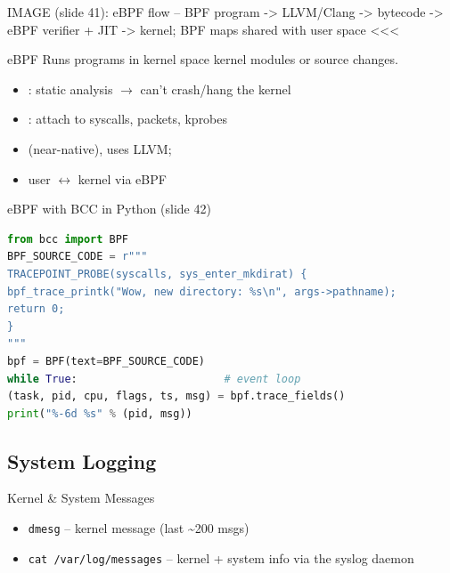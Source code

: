 IMAGE (slide 41): eBPF flow -- BPF program -> LLVM/Clang -> bytecode -> eBPF verifier + JIT -> kernel; BPF maps shared with user space <<<

\begin{concept}{eBPF}
    Runs  programs in kernel space  kernel
    modules or source changes.
    \begin{itemize}
        \item {}: static analysis $\to$ can't crash/hang the kernel
        \item {}: attach to syscalls, packets, kprobes
        \item {} (near-native), uses LLVM; 
        \item user $\leftrightarrow$ kernel via eBPF 
    \end{itemize}
\end{concept}

\begin{examplecode}{eBPF with BCC in Python (slide 42)}
\begin{lstlisting}[language=Python, style=basesmol, aboveskip=2pt, belowskip=2pt]
from bcc import BPF
BPF_SOURCE_CODE = r"""
TRACEPOINT_PROBE(syscalls, sys_enter_mkdirat) {
bpf_trace_printk("Wow, new directory: %s\n", args->pathname);
return 0;
}
"""
bpf = BPF(text=BPF_SOURCE_CODE)
while True:                       # event loop
(task, pid, cpu, flags, ts, msg) = bpf.trace_fields()
print("%-6d %s" % (pid, msg))
\end{lstlisting}
\end{examplecode}

\subsection{System Logging}

\begin{definition}{Kernel \& System Messages}
    \begin{itemize}
        \item \texttt{dmesg} -- kernel message  (last \textasciitilde200 msgs)
        \item \texttt{cat /var/log/messages} -- kernel + system info via the syslog daemon
    \end{itemize}
\end{definition}

